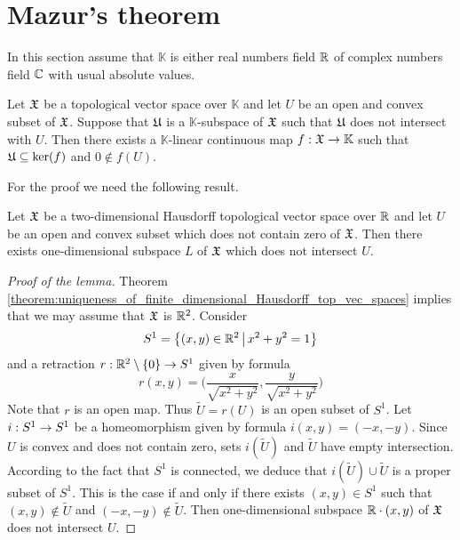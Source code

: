 \documentclass[10pt]{amsart}
\begin{document}
\section{Mazur's theorem}
\noindent
In this section assume that $\mathbb{K}$ is either real numbers field ${\mathbb R}$ of complex numbers field ${\mathbb C}$ with usual absolute values.

\begin{theorem}[Mazur]\label{theorem:Mazurs_hyperplane_separation}
	Let ${\mathfrak X}$ be a topological vector space over $\mathbb{K}$ and let $U$ be an open and convex subset of ${\mathfrak X}$. Suppose that ${\mathfrak U}$ is a $\mathbb{K}$-subspace of ${\mathfrak X}$ such that ${\mathfrak U}$ does not intersect with $U$. Then there exists a $\mathbb{K}$-linear continuous map $f:{\mathfrak X}\rightarrow \mathbb{K}$ such that ${\mathfrak U} \subseteq \mathrm{ker}(f)$ and $0 \not \in f(U)$.
\end{theorem}
\noindent
For the proof we need the following result.

\begin{lemma}\label{lemma:two_dimensional_hyperplane_separation}
	Let ${\mathfrak X}$ be a two-dimensional Hausdorff topological vector space over ${\mathbb R}$ and let $U$ be an open and convex subset which does not contain zero of ${\mathfrak X}$. Then there exists one-dimensional subspace $L$ of ${\mathfrak X}$ which does not intersect $U$.
\end{lemma}
\begin{proof}[Proof of the lemma]
	Theorem \ref{theorem:uniqueness_of_finite_dimensional_Hausdorff_top_vec_spaces} implies that we may assume that ${\mathfrak X}$ is ${\mathbb R}^2$. Consider
	$$S^1 = \big\{(x, y)\in {\mathbb R}^2\,\big|\,x^2 + y^2 = 1\big\}$$
	and a retraction $r:{\mathbb R}^2\setminus \{0\} \rightarrow S^1$ given by formula
	$$r(x, y) = \bigg(\frac{x}{\sqrt{x^2 + y^2}},\frac{y}{\sqrt{x^2 + y^2}}\bigg)$$
	Note that $r$ is an open map. Thus $\tilde{U} = r(U)$ is an open subset of $S^1$. Let $i:S^1\rightarrow S^1$ be a homeomorphism given by formula $i(x, y) = (-x, -y)$. Since $U$ is convex and does not contain zero, sets $i(\tilde{U})$ and $\tilde{U}$ have empty intersection. According to the fact that $S^1$ is connected, we deduce that $i(\tilde{U}) \cup \tilde{U}$ is a proper subset of $S^1$. This is the case if and only if there exists $(x, y) \in S^1$ such that $(x, y) \not \in \tilde{U}$ and $(-x, -y) \not \in \tilde{U}$. Then one-dimensional subspace ${\mathbb R} \cdot (x, y)$ of ${\mathfrak X}$ does not intersect $U$.
\end{proof}
\end{document}
